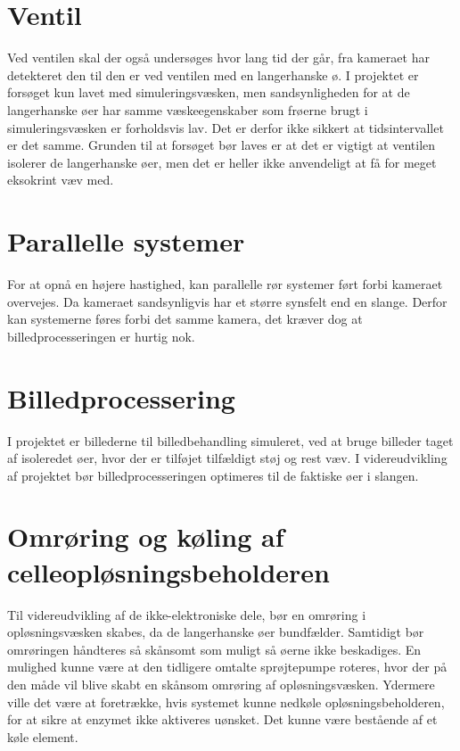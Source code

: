 \section{Ventil}    
Ved ventilen skal der også undersøges hvor lang tid der går, fra kameraet har detekteret den til den er ved ventilen med en langerhanske ø. I projektet er forsøget kun lavet med simuleringsvæsken, men sandsynligheden for at de langerhanske øer har samme væskeegenskaber som frøerne brugt i simuleringsvæsken er forholdsvis lav. Det er derfor ikke sikkert at tidsintervallet er det samme. Grunden til at forsøget bør laves er at det er vigtigt at ventilen isolerer de langerhanske øer, men det er heller ikke anvendeligt at få for meget eksokrint væv med.

\section{Parallelle systemer}
For at opnå en højere hastighed, kan parallelle rør systemer ført forbi kameraet overvejes.
Da kameraet sandsynligvis har et større synsfelt end en slange. Derfor kan systemerne føres forbi det samme kamera, det kræver dog at billedprocesseringen er hurtig nok.

\section{Billedprocessering}
I projektet er billederne til billedbehandling simuleret, ved at bruge billeder taget af isoleredet øer, hvor der er tilføjet tilfældigt støj og rest væv. I videreudvikling af projektet bør billedprocesseringen optimeres til de faktiske øer i slangen.

\section{Omrøring og køling af celleopløsningsbeholderen}
Til videreudvikling af de ikke-elektroniske dele, bør en omrøring i opløsningsvæsken skabes, da de langerhanske øer bundfælder. Samtidigt bør omrøringen håndteres så skånsomt som muligt så øerne ikke beskadiges. En mulighed kunne være at den tidligere omtalte sprøjtepumpe roteres, hvor der på den måde vil blive skabt en skånsom omrøring af opløsningsvæsken. Ydermere ville det være at foretrække, hvis systemet kunne nedkøle opløsningsbeholderen, for at sikre at enzymet ikke aktiveres uønsket. Det kunne være bestående af et køle element. 

